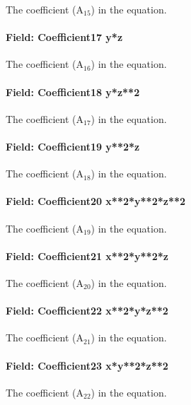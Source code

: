 The coefficient (A\(_{15}\)) in the equation.

\paragraph{Field: Coefficient17 y*z}\label{field-coefficient17-yz}

The coefficient (A\(_{16}\)) in the equation.

\paragraph{Field: Coefficient18 y*z**2}\label{field-coefficient18-yz2}

The coefficient (A\(_{17}\)) in the equation.

\paragraph{Field: Coefficient19 y**2*z}\label{field-coefficient19-y2z}

The coefficient (A\(_{18}\)) in the equation.

\paragraph{Field: Coefficient20 x**2*y**2*z**2}\label{field-coefficient20-x2y2z2}

The coefficient (A\(_{19}\)) in the equation.

\paragraph{Field: Coefficient21 x**2*y**2*z}\label{field-coefficient21-x2y2z}

The coefficient (A\(_{20}\)) in the equation.

\paragraph{Field: Coefficient22 x**2*y*z**2}\label{field-coefficient22-x2yz2}

The coefficient (A\(_{21}\)) in the equation.

\paragraph{Field: Coefficient23 x*y**2*z**2}\label{field-coefficient23-xy2z2}

The coefficient (A\(_{22}\)) in the equation.

